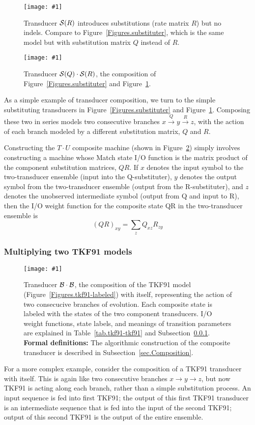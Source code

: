 \documentclass{article}
\newcommand{\secref}[1]{Subsection~\ref{sec.#1}}
\newcommand{\seclabel}[1]{\label{sec.#1}}
\newcommand{\tabnum}[1]{\ref{tab.#1}}
\newcommand{\tabref}[1]{Table~\tabnum{#1}}
\newcommand{\figref}[1]{Figure~\ref{Figures.#1}}
\newcommand{\figlabel}[1]{\label{Figures.#1}}
\newcommand{\easyfig}[4]{
\begin{figure}
\texttt{[image: \#1]}
\caption{ \figlabel{#3} #4}
\end{figure}}
\newcommand{\pdffig}[2]{\easyfig{#1-fig.pdf}{}{#1}{#2}}
\newcommand{\widepdffig}[2]{\easyfig{#1-fig.pdf}{width=\textwidth}{#1}{#2}}
\newcommand\substitute{{\cal S}}
\newcommand\tkf{{\cal B}}
\newcommand\formaldefs{{\bf Formal definitions: }}
\begin{document}
\pdffig{substituter2}{Transducer $\substitute(R)$ introduces substitutions (rate matrix $R$) but no indels. Compare to \figref{substituter}, which is the same model but with substitution matrix $Q$ instead of $R$.}

\pdffig{substituter-substituter2}{Transducer $\substitute(Q) \cdot \substitute(R)$, the composition of \figref{substituter} and \figref{substituter2}.}

As a simple example of transducer composition, we turn to the simple substituting transducers
in \figref{substituter} and \figref{substituter2}.  
Composing these two in series models two consecutive branches 
 $x \stackrel{Q}{\to} y \stackrel{R}{\to} z$, with 
the action of each branch modeled by a different substitution matrix, $Q$ and $R$.  

Constructing the $T \cdot U$ composite machine 
 (shown in \figref{substituter-substituter2})
simply involves constructing a machine whose Match state I/O function
 is the matrix product of the component substitution matrices, $QR$.  
If $x$ denotes the input symbol to the two-transducer ensemble (input into the Q-substituter),
$y$ denotes the output symbol from the two-transducer ensemble (output from the R-substituter),
and $z$ denotes the unobserved intermediate symbol (output from Q and input to R),
then the I/O weight function for the composite state QR in the two-transducer ensemble is
\[
(QR)_{xy} = \sum_z Q_{xz} R_{zy}
\]



\subsubsection{Multiplying two TKF91 models}
\seclabel{tkf91-tkf91}

\widepdffig{tkf91-tkf91}{Transducer $\tkf \cdot \tkf$, the composition of the 
TKF91 model (\figref{tkf91-labeled}) with itself, representing the action of
 two consecucive branches of evolution.
Each composite state is labeled with the states of the two component transducers.  
I/O weight functions, state labels, and meanings of transition parameters are explained
in \tabref{tkf91-tkf91} and \secref{tkf91-tkf91}.
\formaldefs
The algorithmic construction of the composite transducer is described in \secref{Composition}.
}

For a more complex example, consider the composition of a TKF91 transducer with itself.  
This is again like two consecutive branches $x \to y \to z$, 
but now TKF91 is acting along each branch, rather than a simple substitution process. 
An input sequence is fed into first TKF91; 
the output of this first TKF91 transducer is an intermediate sequence
 that is fed into the input of the second TKF91;
output of this second TKF91 is the output of the entire ensemble.
\end{document}
